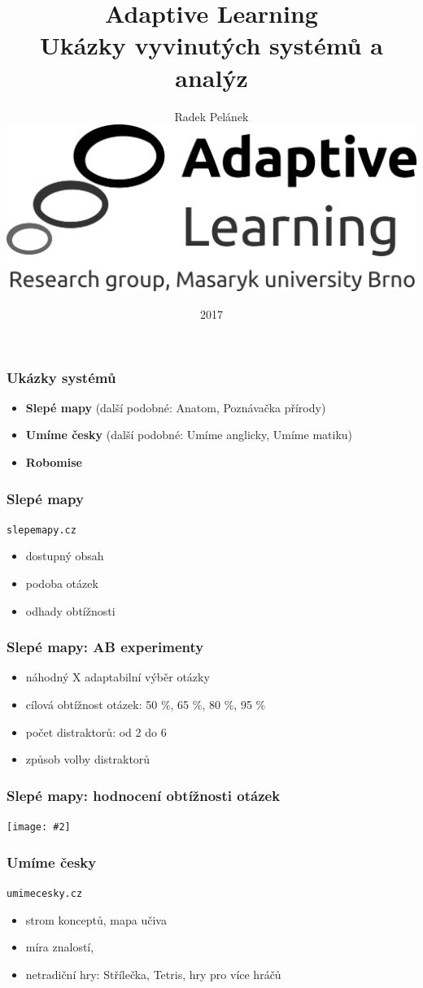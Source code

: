\documentclass[bigger]{beamer}
\title{Adaptive Learning\\Ukázky vyvinutých systémů a analýz}
\author{Radek Pelánek\\[10mm]
  \includegraphics[width=.2\linewidth]{al-logo-researchgroup}}
\date{2017}
\newcommand{\img}[2]{\begin{center}\texttt{[image: \#2]}\end{center}}
\begin{document}
\frame{\titlepage}

\begin{frame}
  \frametitle{Ukázky systémů}

  \begin{itemize}
  \item \textbf{Slepé mapy} (další podobné: Anatom, Poznávačka přírody)
  \item \textbf{Umíme česky} (další podobné: Umíme anglicky, Umíme matiku)
  \item \textbf{Robomise}
  \end{itemize}
\end{frame}

\begin{frame}
  \frametitle{Slepé mapy}

  \texttt{slepemapy.cz}

  \bigskip

  \begin{itemize}
  \item dostupný obsah
  \item podoba otázek
  \item odhady obtížnosti
  \end{itemize}
\end{frame}

\begin{frame}
  \frametitle{Slepé mapy: AB experimenty}

  \begin{itemize}
  \item náhodný X adaptabilní výběr otázky
  \item cílová obtížnost otázek: 50 \%, 65 \%, 80 \%, 95 \%
  \item počet distraktorů: od 2 do 6
  \item způsob volby distraktorů
  \end{itemize}  
\end{frame}

\begin{frame}
  \frametitle{Slepé mapy: hodnocení obtížnosti otázek}

  \img{.95}{ratings}
\end{frame}

\begin{frame}
  \frametitle{Umíme česky}

  \texttt{umimecesky.cz}

  \bigskip

  \begin{itemize}
  \item strom konceptů, mapa učiva
  \item míra znalostí, 
  \item netradiční hry: Střílečka, Tetris, hry pro více hráčů
  \end{itemize}
\end{frame}
\end{document}
